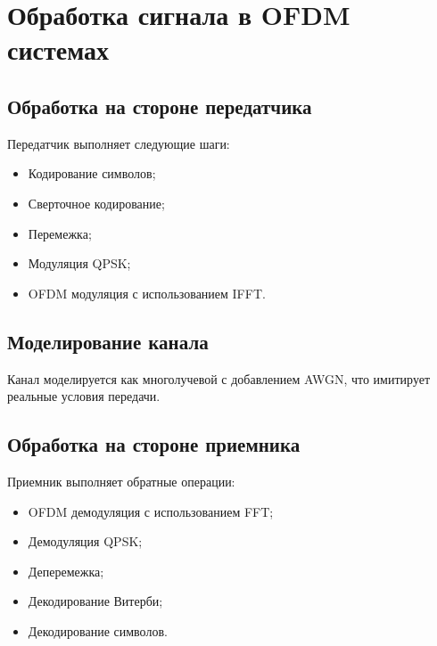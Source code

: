 \chapter{Обработка сигнала в OFDM системах}

\section{Обработка на стороне передатчика}

Передатчик выполняет следующие шаги:
\begin{itemize}
    \item Кодирование символов;
    \item Сверточное кодирование;
    \item Перемежка;
    \item Модуляция QPSK;
    \item OFDM модуляция с использованием IFFT.
\end{itemize}

\section{Моделирование канала}

Канал моделируется как многолучевой с добавлением AWGN, что имитирует реальные условия передачи.

\section{Обработка на стороне приемника}

Приемник выполняет обратные операции:
\begin{itemize}
    \item OFDM демодуляция с использованием FFT;
    \item Демодуляция QPSK;
    \item Деперемежка;
    \item Декодирование Витерби;
    \item Декодирование символов.
\end{itemize}